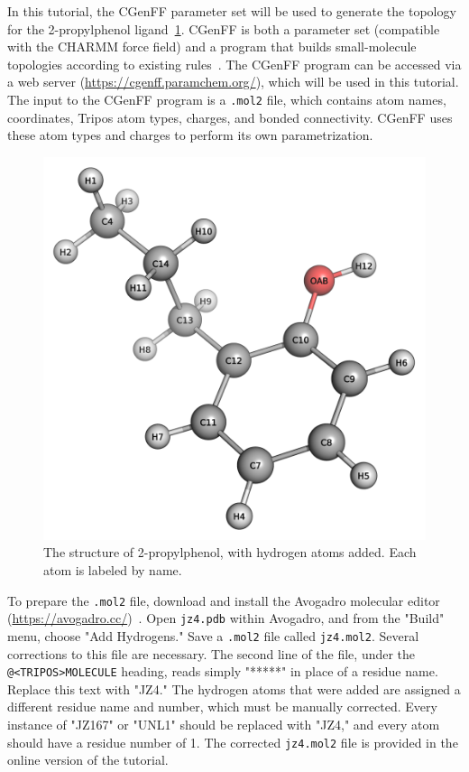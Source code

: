 \documentclass[9pt,tutorial]{livecoms}
\begin{document}
In this tutorial, the CGenFF parameter set will be used to generate the topology for the 2-propylphenol ligand~\ref{jz4_fig}. CGenFF is both a parameter set (compatible with the CHARMM force field) and a program that builds small-molecule topologies according to existing rules~\cite{Vanommeslaeghe2012a,Vanommeslaeghe2012b}. The CGenFF program can be accessed via a web server (\url{https://cgenff.paramchem.org/}), which will be used in this tutorial. The input to the CGenFF program is a \texttt{.mol2} file, which contains atom names, coordinates, Tripos atom types, charges, and bonded connectivity. CGenFF uses these atom types and charges to perform its own parametrization.

\begin{figure}[h!]
\centering
\includegraphics{jz4}
\caption{The structure of 2-propylphenol, with hydrogen atoms added. Each atom is labeled by name.}
\label{jz4_fig}
\end{figure}

To prepare the \texttt{.mol2} file, download and install the Avogadro molecular editor (\url{https://avogadro.cc/})~\cite{Hanwell2012}. Open \texttt{jz4.pdb} within Avogadro, and from the "Build" menu, choose "Add Hydrogens." Save a \texttt{.mol2} file called \texttt{jz4.mol2}. Several corrections to this file are necessary. The second line of the file, under the \texttt{@<TRIPOS>MOLECULE} heading, reads simply "*****" in place of a residue name. Replace this text with "JZ4." The hydrogen atoms that were added are assigned a different residue name and number, which must be manually corrected. Every instance of "JZ167" or "UNL1" should be replaced with "JZ4," and every atom should have a residue number of 1. The corrected \texttt{jz4.mol2} file is provided in the online version of the tutorial.
\end{document}
